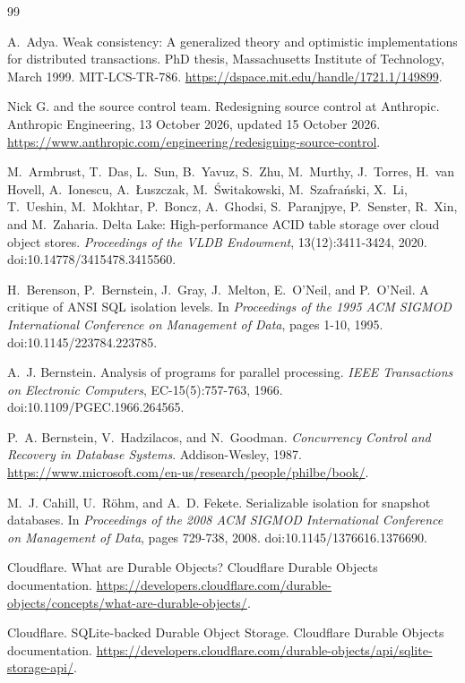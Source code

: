 \documentclass[11pt,letterpaper]{article}
\theoremstyle{definition}
\theoremstyle{remark}
\begin{document}
\begin{thebibliography}{99}
\small

A.~Adya.
Weak consistency: A generalized theory and optimistic implementations for distributed transactions.
PhD thesis, Massachusetts Institute of Technology, March 1999. MIT-LCS-TR-786.
\url{https://dspace.mit.edu/handle/1721.1/149899}.

Nick G. and the source control team.
Redesigning source control at Anthropic.
Anthropic Engineering, 13 October 2026, updated 15 October 2026.
\url{https://www.anthropic.com/engineering/redesigning-source-control}.

M.~Armbrust, T.~Das, L.~Sun, B.~Yavuz, S.~Zhu, M.~Murthy, J.~Torres, H.~van Hovell, A.~Ionescu, A.~{\L}uszczak, M.~{\'S}witakowski, M.~Szafra{\'n}ski, X.~Li, T.~Ueshin, M.~Mokhtar, P.~Boncz, A.~Ghodsi, S.~Paranjpye, P.~Senster, R.~Xin, and M.~Zaharia.
Delta Lake: High-performance ACID table storage over cloud object stores.
\emph{Proceedings of the VLDB Endowment}, 13(12):3411-3424, 2020.
doi:10.14778/3415478.3415560.

H.~Berenson, P.~Bernstein, J.~Gray, J.~Melton, E.~O'Neil, and P.~O'Neil.
A critique of ANSI SQL isolation levels.
In \emph{Proceedings of the 1995 ACM SIGMOD International Conference on Management of Data}, pages 1-10, 1995.
doi:10.1145/223784.223785.

A.~J. Bernstein.
Analysis of programs for parallel processing.
\emph{IEEE Transactions on Electronic Computers}, EC-15(5):757-763, 1966.
doi:10.1109/PGEC.1966.264565.

P.~A. Bernstein, V.~Hadzilacos, and N.~Goodman.
\emph{Concurrency Control and Recovery in Database Systems}.
Addison-Wesley, 1987.
\url{https://www.microsoft.com/en-us/research/people/philbe/book/}.

M.~J. Cahill, U.~R{\"o}hm, and A.~D. Fekete.
Serializable isolation for snapshot databases.
In \emph{Proceedings of the 2008 ACM SIGMOD International Conference on Management of Data}, pages 729-738, 2008.
doi:10.1145/1376616.1376690.

Cloudflare.
What are Durable Objects?
Cloudflare Durable Objects documentation.
\url{https://developers.cloudflare.com/durable-objects/concepts/what-are-durable-objects/}.

Cloudflare.
SQLite-backed Durable Object Storage.
Cloudflare Durable Objects documentation.
\url{https://developers.cloudflare.com/durable-objects/api/sqlite-storage-api/}.


\end{thebibliography}
\end{document}
